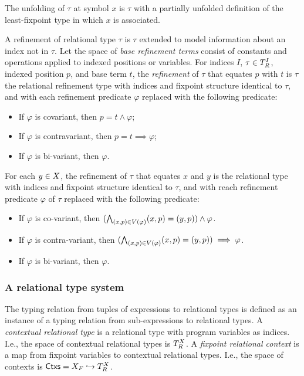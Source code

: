 %
The unfolding of $\tau$ at symbol $x$ is $\tau$ with a partially
unfolded definition of the least-fixpoint type in which $x$ is
associated.

A refinement of relational type $\tau$ is $\tau$ extended to model
information about an index not in $\tau$.
%
Let the space of \emph{base refinement terms} consist of constants and
operations applied to indexed positions or variables.
%
For indices $I$, $\tau \in T_{R}^{I}$, indexed position $p$, and
base term $t$, the \emph{refinement} of $\tau$ that equates $p$ with
$t$ is $\tau$ the relational refinement type with indices and fixpoint
structure identical to $\tau$, and with each refinement predicate
$\varphi$ replaced with the following predicate:
%
\begin{itemize}
\item %
  If $\varphi$ is covariant, then $p = t \land \varphi$;
\item %
  If $\varphi$ is contravariant, then $p = t \implies \varphi$;
\item %
  If $\varphi$ is bi-variant, then $\varphi$.
\end{itemize}
%
For each $y \in X$, the refinement of $\tau$ that equates $x$ and
$y$ is the relational type with indices and fixpoint structure
identical to $\tau$, and with reach refinement predicate $\varphi$ of
$\tau$ replaced with the following predicate:
%
\begin{itemize}
\item %
  If $\varphi$ is co-variant, then
  $(\bigwedge_{(x, p) \in V(\varphi)} (x, p) = (y, p)) \land \varphi$.
\item %
  If $\varphi$ is contra-variant, then
  $(\bigwedge_{(x, p) \in V(\varphi)} (x, p) = (y, p)) \implies \varphi$.
\item %
  If $\varphi$ is bi-variant, then $\varphi$.
\end{itemize}

\subsubsection{A relational type system}
\label{sec:rel-type-sys}
%
The typing relation from tuples of expressions to relational types is
defined as an instance of a typing relation from sub-expressions to
relational types.
A \emph{contextual relational type} is a relational type with program
variables as indices.
%
I.e., the space of contextual relational types is $T_{R}^{X}$.
%
A \emph{fixpoint relational context} is a map from fixpoint variables
to contextual relational types.
%
I.e., the space of contexts is
$\mathsf{Ctxs} = X_F \hookrightarrow T_R^{X}$.

